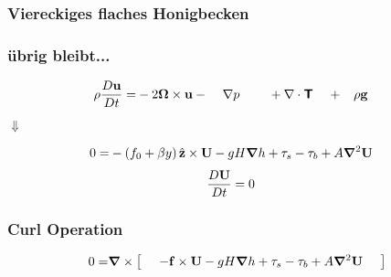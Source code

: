 \begin{frame}
	\frametitle{Viereckiges flaches Honigbecken}
\end{frame}

\begin{frame}
\frametitle{übrig bleibt...}
\begin{align}
	\rho \frac{D\mathbf{\bm{u}}}{Dt} 
	=
	&- 2\mathbf{\bm{\Omega}} \times \mathbf{\bm{u}} -\;\;\;\;\nabla p  \;\;\;\;\;\;\;\;    + \nabla \cdot\boldsymbol{\mathsf{T}}\;\;\;\; +\;\;\; \rho\mathbf{\bm{g}} \nonumber 
\end{align}
\begin{center}
	$\Downarrow$
\end{center}
\begin{align}
	0
	=
	&  -\left( f_{0} + \beta y \right) \hat{\mathbf{\bm{z}}} \times \mathbf{\bm{U}} -    gH\mathbf{\bm{\nabla}}{h}  + \mathbf{\tau}_{s} - \mathbf{\tau}_{b}+ A\mathbf{\bm{\nabla}}^{2} \mathbf{\bm{U}} 
\end{align}
\begin{align}
	\frac{D\mathbf{\bm{U}}}{Dt}
	&=
	0
\end{align}
\end{frame}

\begin{frame}
\frametitle{Curl Operation}
\begin{align}
	0
	=&  \mathbf{\bm{\nabla}} \times \left[\;\;\;\;\;   -\mathbf{\bm{f}} \times \mathbf{\bm{U}}   -    g H \mathbf{\bm{\nabla}}{h} + \mathbf{\tau}_{s} - \mathbf{\tau}_{b} + A  \mathbf{\bm{\nabla}}^{2} \mathbf{\bm{U}} \;\;\;\;\;   \right]  \nonumber \\
     &     \nonumber 
\end{align}
\end{frame}

